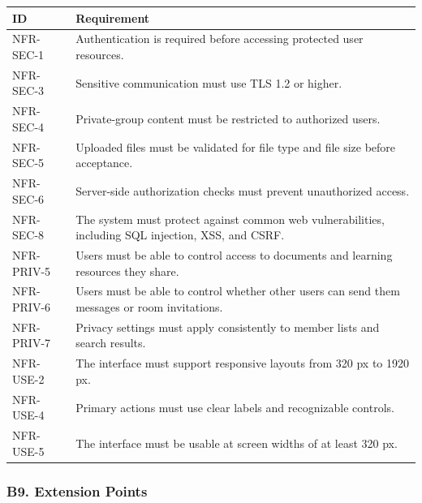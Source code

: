 \documentclass[12pt]{article}
\renewcommand{\baselinestretch}{1.5}
\begin{document}
\begingroup
\small
\renewcommand{\baselinestretch}{1.0}\selectfont
\renewcommand{\arraystretch}{1.15}
\setlength{\tabcolsep}{6pt}
\begin{longtable}{|>{\raggedright\arraybackslash}p{}|>{\raggedright\arraybackslash}p{}|}
\hline
\textbf{ID} & \textbf{Requirement} \\ \hline
\endhead
NFR-SEC-1 & Authentication is required before accessing protected user resources. \\ \hline
NFR-SEC-3 & Sensitive communication must use TLS 1.2 or higher. \\ \hline
NFR-SEC-4 & Private-group content must be restricted to authorized users. \\ \hline
NFR-SEC-5 & Uploaded files must be validated for file type and file size before acceptance. \\ \hline
NFR-SEC-6 & Server-side authorization checks must prevent unauthorized access. \\ \hline
NFR-SEC-8 & The system must protect against common web vulnerabilities, including SQL injection, XSS, and CSRF. \\ \hline
NFR-PRIV-5 & Users must be able to control access to documents and learning resources they share. \\ \hline
NFR-PRIV-6 & Users must be able to control whether other users can send them messages or room invitations. \\ \hline
NFR-PRIV-7 & Privacy settings must apply consistently to member lists and search results. \\ \hline
NFR-USE-2 & The interface must support responsive layouts from 320 px to 1920 px. \\ \hline
NFR-USE-4 & Primary actions must use clear labels and recognizable controls. \\ \hline
NFR-USE-5 & The interface must be usable at screen widths of at least 320 px. \\ \hline
\end{longtable}
\endgroup
\par\medskip

\hypertarget{sec:b9-extension-points}{}
\subsubsection*{B9. Extension Points}
\par\medskip
\end{document}
